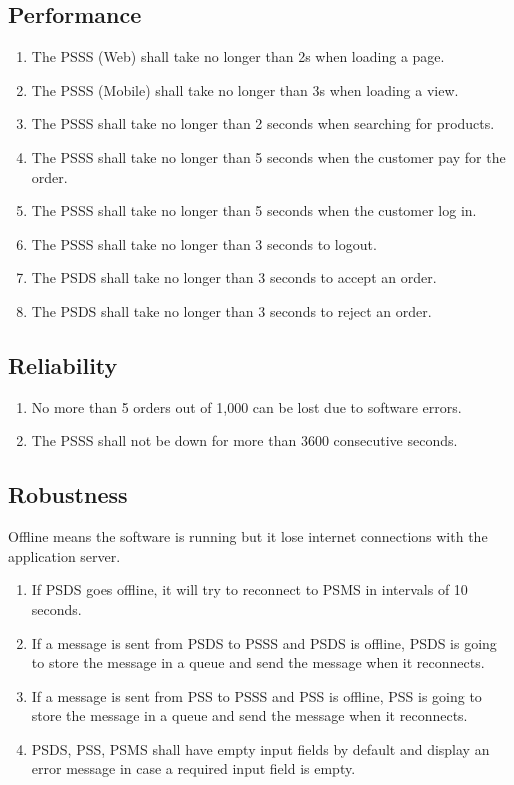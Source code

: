 \subsection{Performance}
\begin{enumerate}[label=SEC-\arabic*]
    \item The PSSS (Web) shall take no longer than 2s when loading a page.
    \item The PSSS (Mobile) shall take no longer than 3s when loading a view. 
    \item The PSSS shall take no longer than 2 seconds when searching for 
    products.
    \item The PSSS shall take no longer than 5 seconds when the customer 
    pay for the order.
    \item The PSSS shall take no longer than 5 seconds when the customer 
    log in.
    \item The PSSS shall take no longer than 3 seconds to logout.
    \item The PSDS shall take no longer than 3 seconds to accept an order.
    \item The PSDS shall take no longer than 3 seconds to reject an order.
    
\end{enumerate}

\subsection{Reliability}
\begin{enumerate}[label=SEC-\arabic*]
    \item No more than 5 orders out of 1,000 can be lost due to software errors.
    \item The PSSS shall not be down for more than 3600 consecutive seconds.
\end{enumerate}

\subsection{Robustness}
Offline means the software is running but it lose internet connections 
with the application server.

\begin{enumerate}[label=SEC-\arabic*]
    \item If PSDS goes offline, it will try to reconnect to PSMS in 
    intervals of 10 seconds.
    \item If a message is sent from PSDS to PSSS and PSDS is offline, PSDS is 
    going to store the message in a queue and send the message 
    when it reconnects.
    \item If a message is sent from PSS to PSSS and PSS is offline, PSS is 
    going to store the message in a queue and send the message 
    when it reconnects.
    \item PSDS, PSS, PSMS shall have empty input fields by default and display 
    an error message in case a required input field is empty.
\end{enumerate}

